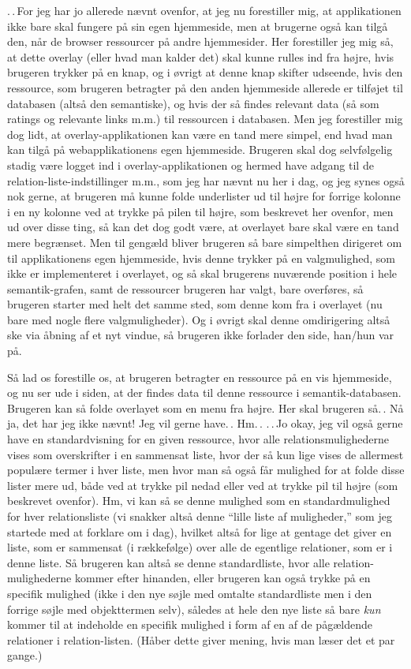 \documentclass{report}
\begin{document}
.\,.\,For jeg har jo allerede nævnt ovenfor, at jeg nu forestiller mig, at applikationen ikke bare skal fungere på sin egen hjemmeside, men at brugerne også kan tilgå den, når de browser ressourcer på andre hjemmesider. Her forestiller jeg mig så, at dette overlay (eller hvad man kalder det) skal kunne rulles ind fra højre, hvis brugeren trykker på en knap, og i øvrigt at denne knap skifter udseende, hvis den ressource, som brugeren betragter på den anden hjemmeside allerede er tilføjet til databasen (altså den semantiske), og hvis der så findes relevant data (så som ratings og relevante links m.m.) til ressourcen i databasen. Men jeg forestiller mig dog lidt, at overlay-applikationen kan være en tand mere simpel, end hvad man kan tilgå på webapplikationens egen hjemmeside. Brugeren skal dog selvfølgelig stadig være logget ind i overlay-applikationen og hermed have adgang til de relation-liste-indstillinger m.m., som jeg har nævnt nu her i dag, og jeg synes også nok gerne, at brugeren må kunne folde underlister ud til højre for forrige kolonne i en ny kolonne ved at trykke på pilen til højre, som beskrevet her ovenfor, men ud over disse ting, så kan det dog godt være, at overlayet bare skal være en tand mere begrænset. Men til gengæld bliver brugeren så bare simpelthen dirigeret om til applikationens egen hjemmeside, hvis denne trykker på en valgmulighed, som ikke er implementeret i overlayet, og så skal brugerens nuværende position i hele semantik-grafen, samt de ressourcer brugeren har valgt, bare overføres, så brugeren starter med helt det samme sted, som denne kom fra i overlayet (nu bare med nogle flere valgmuligheder). Og i øvrigt skal denne omdirigering altså ske via åbning af et nyt vindue, så brugeren ikke forlader den side, han/hun var på. 

Så lad os forestille os, at brugeren betragter en ressource på en vis hjemmeside, og nu ser ude i siden, at der findes data til denne ressource i semantik-databasen. Brugeren kan så folde overlayet som en menu fra højre. Her skal brugeren så.\,. Nå ja, det har jeg ikke nævnt! Jeg vil gerne have.\,. Hm.\,. .\,.\,Jo okay, jeg vil også gerne have en standardvisning for en given ressource, hvor alle relationsmulighederne vises som overskrifter i en sammensat liste, hvor der så kun lige vises de allermest populære termer i hver liste, men hvor man så også får mulighed for at folde disse lister mere ud, både ved at trykke pil nedad eller ved at trykke pil til højre (som beskrevet ovenfor). Hm, vi kan så se denne mulighed som en standardmulighed for hver relationsliste (vi snakker altså denne ``lille liste af muligheder,'' som jeg startede med at forklare om i dag), hvilket altså for lige at gentage det giver en liste, som er sammensat (i rækkefølge) over alle de egentlige relationer, som er i denne liste. Så brugeren kan altså se denne standardliste, hvor alle relation-mulighederne kommer efter hinanden, eller brugeren kan også trykke på en specifik mulighed (ikke i den nye søjle med omtalte standardliste men i den forrige søjle med objekttermen selv), således at hele den nye liste så bare \emph{kun} kommer til at indeholde en specifik mulighed i form af en af de pågældende relationer i relation-listen. (Håber dette giver mening, hvis man læser det et par gange.)
\end{document}
